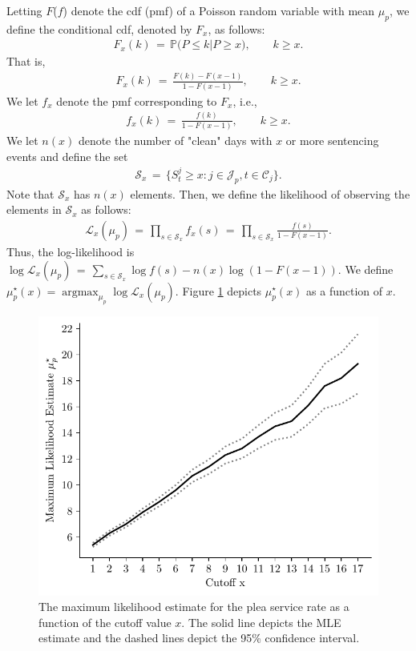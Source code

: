 \documentclass[11pt, oneside]{article}   	%
\theoremstyle{ModifiedStyle}
\DeclareMathOperator*{\argmax}{argmax}
\begin{document}
Letting $F$($f$)  denote the cdf (pmf) of a Poisson random variable with mean $\mu_p$, we define the conditional cdf, denoted by $F_x$, as follows:
\begin{align*}
	F_x(k) \,=\, \mathbb{P}\big( P \leq k | P \geq x \big), \quad\quad k\geq x.
\end{align*}
That is,
\begin{align*}
	F_x(k) \,=\, \frac{F(k)-F(x-1)}{1-F(x-1)}, \quad\quad k\geq x.
\end{align*}
We let $f_x$ denote the pmf corresponding to $F_x$, i.e., 
\begin{align*}
	f_x(k) \,=\, \frac{f(k)}{1-F(x-1)}, \quad\quad k \geq x.
\end{align*}
We let $n(x)$ denote the number of "clean" days with $x$ or more sentencing events and define the set 
\begin{align*}
	\mathcal{S}_x \,=\, \{ S^j_t \geq x: j\in\mathcal{J}_p,t\in\mathcal{C}_j \}.
\end{align*}
Note that $\mathcal{S}_x$ has $n(x)$ elements. Then, we define the likelihood of observing the elements in $\mathcal{S}_x$ as follows:
\begin{align*}
	\mathcal{L}_x(\mu_p) \,=\, \prod_{s\in\mathcal{S}_x} f_x(s) \,=\, \prod_{s\in\mathcal{S}_x} \frac{f(s)}{1-F(x-1)}.
\end{align*}
Thus, the log-likelihood is $\log \mathcal{L}_x(\mu_p) \,=\, \sum_{s\in\mathcal{S}_x} \log f(s) - n(x) \log (1-F(x-1))$. We define $\mu^\star_p(x) = \argmax_{\mu_p} \log \mathcal{L}_x(\mu_p)$. Figure \ref{Figure_Plea_Service_Rate_MLE_Estimate} depicts $\mu^\star_p(x)$ as a function of $x$. 
%
\begin{figure}[H]
	\centering
	\includegraphics[scale=0.75]{Figures/Likelihood_Estiamtes_Top}
	\vspace{-2mm}
	\caption{The maximum likelihood estimate for the plea service rate as a function of the cutoff value $x$. The solid line depicts the MLE estimate and the dashed lines depict the 95\% confidence interval.}
	\label{Figure_Plea_Service_Rate_MLE_Estimate}
\end{figure}
\end{document}
